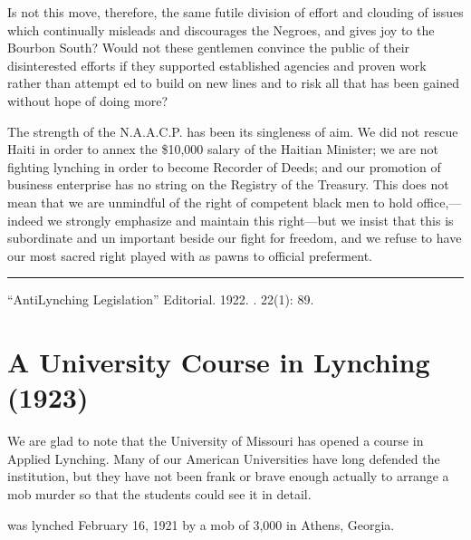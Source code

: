 \documentclass[letterpaper,10pt,english]{jupyterBook}
\begin{document}
\sphinxAtStartPar
Is not this move, therefore, the same futile division of effort and clouding of issues which continually misleads and discourages the Negroes, and gives joy to the Bourbon South? Would not these gentlemen convince the public of their disinterested efforts if they supported established agencies and proven work rather than attempt­ ed to build on new lines and to risk all that has been gained without hope of doing more?

\sphinxAtStartPar
The strength of the N.A.A.C.P. has been its singleness of aim. We did not rescue Haiti in order to annex the \$10,000 salary of the Haitian Minister; we are not fighting lynching in order to become Recorder of Deeds; and our promotion of business enterprise has no string on the Registry of the Treasury. This does not mean that we are unmindful of the right of competent black men to hold office,—indeed we strongly emphasize and maintain this right—but we in­sist that this is subordinate and un­ important beside our fight for freedom, and we refuse to have our most sacred right played with as pawns to official preferment.


\bigskip\hrule\bigskip


\sphinxAtStartPar
{} “Anti\sphinxhyphen{}Lynching Legislation” Editorial. 1922. . 22(1): 8\sphinxhyphen{}9.


\section{A University Course in Lynching (1923)}
\label{\detokenize{Volumes/26/02/university_course_in_lynching:a-university-course-in-lynching-1923}}\label{\detokenize{Volumes/26/02/university_course_in_lynching::doc}}


\sphinxAtStartPar
We are glad to note that the University of Missouri has opened a course in Applied Lynching. Many of our American Universities have long defended the institution, but they have not been frank or brave enough actually to arrange a mob murder so that the students could see it in detail.

\begin{sphinxShadowBox}
\sphinxstylesidebartitle{}

\sphinxAtStartPar
{} was lynched February 16, 1921 by a mob of 3,000 in Athens, Georgia.
\end{sphinxShadowBox}
\end{document}
